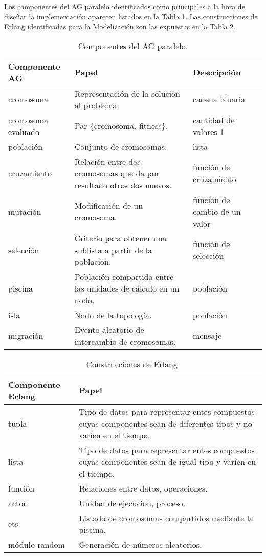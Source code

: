 \documentclass[runningheads]{llncs}
\begin{document}
Los componentes del AG paralelo identificados como principales a la hora de diseñar la implementación aparecen listados en la Tabla \ref{agpComp}. Las construcciones de Erlang identificadas para la Modelización son las expuestas en la Tabla \ref{erlComp}.


\begin{table}
  \centering
   \begin{tabular}{|p{3.2cm}|p{5cm}|p{3cm}|}
   \hline
   \textbf{Componente AG} & \textbf{Papel} & \textbf{Descripción}\\
     \hline
      cromosoma & Representación de la solución al problema. & cadena binaria \\
     \hline
      cromosoma evaluado & Par \{cromosoma, fitness\}. & cantidad de valores 1\\
     \hline
      población & Conjunto de cromosomas. & lista\\
     \hline
     cruzamiento & Relación entre dos cromosomas que da por resultado otros dos nuevos. & función de cruzamiento\\
     \hline
      mutación & Modificación de un cromosoma.& función de cambio de un valor\\
     \hline
     selección & Criterio para obtener una sublista a partir de la población. & función de selección\\
     \hline
      piscina & Población compartida entre las unidades de cálculo en un nodo. & población\\
     \hline
      isla & Nodo de la topología. & población\\
     \hline
      migración & Evento aleatorio de intercambio de cromosomas. & mensaje\\
     \hline
   \end{tabular}
  \caption{Componentes del AG paralelo.}\label{agpComp}
\end{table}

\begin{table}
  \centering
\begin{tabular}{|p{3.4cm}|p{7cm}|}
  \hline
  \textbf{Componente Erlang} & \textbf{Papel} \\
     \hline
  tupla & Tipo de datos para representar entes compuestos cuyas componentes sean de diferentes tipos y no varíen en el tiempo. \\
     \hline
  lista & Tipo de datos para representar entes compuestos cuyas componentes sean de igual tipo y varíen en el tiempo. \\
     \hline
  función & Relaciones entre datos, operaciones. \\
     \hline
  actor & Unidad de ejecución, proceso. \\
     \hline
  ets & Listado de cromosomas compartidos mediante la piscina. \\
     \hline
  módulo random & Generación de números aleatorios. \\
  \hline
\end{tabular}
  \caption{Construcciones de Erlang.}\label{erlComp}
\end{table}
\end{document}
